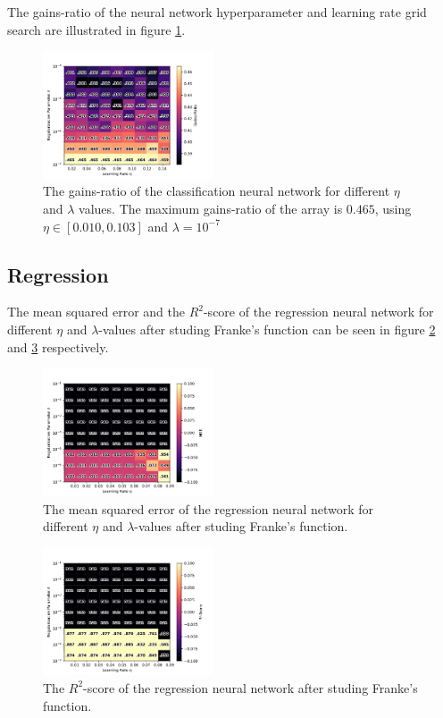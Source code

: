 		The gains-ratio of the neural network hyperparameter and learning rate grid search are illustrated in figure \ref{fig:cc_gr}.
		\begin{figure}[H]
			\centering
			\includegraphics[width=0.45\textwidth]{figures/cc_res_3.pdf}
			\caption{The gains-ratio of the classification neural network for different $\eta$ and $\lambda$ values. The maximum gains-ratio of the array is $0.465$, using $\eta \in [0.010, 0.103]$ and $\lambda=10^{-7}$}
			\label{fig:cc_gr}
		\end{figure}
	
        
        
    \subsection{Regression}
    
    	The mean squared error and the $R^2$-score of the regression neural network for different $\eta$ and $\lambda$-values after studing Franke's function can be seen in figure \ref{fig:ff_mse} and \ref{fig:ff_r2} respectively.
    
    	\begin{figure}[H]
    		\centering
    		\includegraphics[width=0.45\textwidth]{figures/ff_res_0.pdf}
    		\caption{The mean squared error of the regression neural network for different $\eta$ and $\lambda$-values after studing Franke's function.}
    		\label{fig:ff_mse}
    	\end{figure}
    	\begin{figure}[H]
    		\centering
    		\includegraphics[width=0.45\textwidth]{figures/ff_res_1.pdf}
    		\caption{The $R^2$-score of the regression neural network after studing Franke's function.}
    		\label{fig:ff_r2}
    	\end{figure}
    

